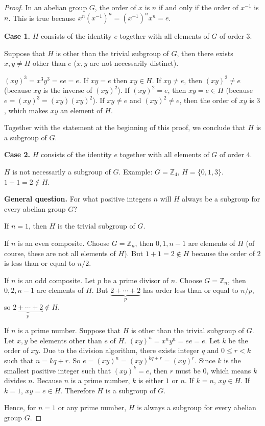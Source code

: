 \begin{proof}
    In an abelian group $G$, the order of $x$ is $n$ if and only if the order of $x^{-1}$ is $n$. This is true because $x^{n}{(x^{-1})}^{n} = {(x^{-1})}^{n}x^{n} = e$.

    \textbf{Case 1.} $H$ consists of the identity $e$ together with all elements of $G$ of order $3$.

    Suppose that $H$ is other than the trivial subgroup of $G$, then there exists $x, y\ne H$ other than $e$ ($x, y$ are not necessarily distinct).

    ${(xy)}^{3} = x^{3}y^{3} = ee = e$. If $xy = e$ then $xy\in H$. If $xy\ne e$, then ${(xy)}^{2} \ne e$ (because $xy$ is the inverse of ${(xy)}^{2}$). If ${(xy)}^{2} = e$, then $xy = e\in H$ (because $e = {(xy)}^{3} = (xy){(xy)}^{2}$). If $xy\ne e$ and ${(xy)}^{2}\ne e$, then the order of $xy$ is $3$, which makes $xy$ an element of $H$.

    Together with the statement at the beginning of this proof, we conclude that $H$ is a subgroup of $G$.

    \textbf{Case 2.} $H$ consists of the identity $e$ together with all elements of $G$ of order $4$.

    $H$ is not necessarily a subgroup of $G$. Example: $G = \mathbb{Z}_{4}$, $H = \{ 0, 1, 3 \}$. $1 + 1 = 2\notin H$.

    \textbf{General question.} For what positive integers $n$ will $H$ always be a subgroup for every abelian group $G$?

    If $n = 1$, then $H$ is the trivial subgroup of $G$.

    If $n$ is an even composite. Choose $G = \mathbb{Z}_{n}$, then $0, 1, n - 1$ are elements of $H$ (of course, these are not all elements of $H$). But $1 + 1 = 2\notin H$ because the order of $2$ is less than or equal to $n/2$.

    If $n$ is an odd composite. Let $p$ be a prime divisor of $n$. Choose $G = \mathbb{Z}_{n}$, then $0, 2, n - 1$ are elements of $H$. But $\underbrace{2 + \cdots + 2}_{p}$ has order less than or equal to $n/p$, so $\underbrace{2 + \cdots + 2}_{p} \notin H$.

    If $n$ is a prime number. Suppose that $H$ is other than the trivial subgroup of $G$. Let $x, y$ be elements other than $e$ of $H$. ${(xy)}^{n} = x^{n}y^{n} = ee = e$. Let $k$ be the order of $xy$. Due to the division algorithm, there exists integer $q$ and $0\leq r < k$ such that $n = kq + r$. So $e = {(xy)}^{n} = {(xy)}^{kq + r} = {(xy)}^{r}$. Since $k$ is the smallest positive integer such that ${(xy)}^{k} = e$, then $r$ must be $0$, which means $k$ divides $n$. Because $n$ is a prime number, $k$ is either $1$ or $n$. If $k = n$, $xy\in H$. If $k = 1$, $xy = e\in H$. Therefore $H$ is a subgroup of $G$.

    Hence, for $n = 1$ or any prime number, $H$ is always a subgroup for every abelian group $G$.
\end{proof}

